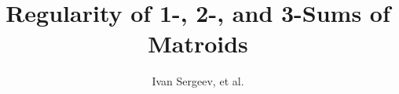 
\title{Regularity of 1-, 2-, and 3-Sums of Matroids}
\author{Ivan Sergeev, et al.}

\usepackage{amsmath} %
\usepackage{amssymb} %
\usepackage{amsthm} %
\usepackage[unicode,colorlinks=true,linkcolor=blue,urlcolor=magenta,citecolor=blue]{hyperref}  %
\usepackage{tikz}  %
\newtheorem{theorem}{Theorem}
\theoremstyle{definition}
\newtheorem{definition}[theorem]{Definition}
\newtheorem{lemma}[theorem]{Lemma}
\newtheorem{corollary}[theorem]{Corollary}

\newcommand{\SeeLean}{See implementation in Lean.}
